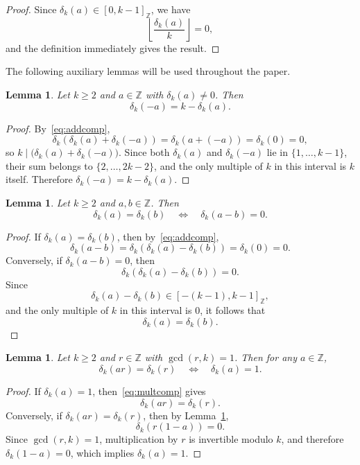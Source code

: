 \documentclass[12pt]{article}
\newtheorem{lemma}[theorem]{Lemma}
\begin{document}
\begin{proof}
Since $\delta_k(a) \in [0,k-1]_{\mathbb{Z}}$, we have
\[
\left\lfloor \frac{\delta_k(a)}{k} \right\rfloor = 0,
\]
and the definition immediately gives the result.
\end{proof}

The following auxiliary lemmas will be used throughout the paper.

\begin{lemma}\label{lema:cp2}
Let $k \ge 2$ and $a \in \mathbb{Z}$ with $\delta_k(a) \neq 0$. Then
\[
\delta_k(-a) = k - \delta_k(a).
\]
\end{lemma}

\begin{proof}
By~\eqref{eq:addcomp},
\[
\delta_k\!\left(\delta_k(a) + \delta_k(-a)\right)
= \delta_k(a + (-a))
= \delta_k(0)
= 0,
\]
so $k \mid \bigl(\delta_k(a) + \delta_k(-a)\bigr)$.
Since both $\delta_k(a)$ and $\delta_k(-a)$ lie in $\{1,\dots,k-1\}$,
their sum belongs to $\{2,\dots,2k-2\}$, and the only multiple of $k$
in this interval is $k$ itself. Therefore $\delta_k(-a) = k - \delta_k(a)$.
\end{proof}

\begin{lemma}\label{lema:despeje}
Let $k \ge 2$ and $a,b \in \mathbb{Z}$. Then
\[
\delta_k(a) = \delta_k(b)
\quad\Longleftrightarrow\quad
\delta_k(a-b) = 0.
\]
\end{lemma}

\begin{proof}
If $\delta_k(a)=\delta_k(b)$, then by~\eqref{eq:addcomp},
\[
\delta_k(a-b)
=
\delta_k\!\left(\delta_k(a)-\delta_k(b)\right)
=
\delta_k(0)
=
0.
\]
Conversely, if $\delta_k(a-b)=0$, then
\[
\delta_k\!\left(\delta_k(a)-\delta_k(b)\right)=0.
\]
Since
\[
\delta_k(a)-\delta_k(b)
\in [-(k-1),k-1]_{\mathbb{Z}},
\]
and the only multiple of $k$ in this interval is $0$, it follows that
\[
\delta_k(a)=\delta_k(b).
\]
\end{proof}

\begin{lemma}\label{lema_pote}
Let $k \ge 2$ and $r \in \mathbb{Z}$ with $\gcd(r,k)=1$. Then for any 
$a \in \mathbb{Z}$,
\[
\delta_k(ar) = \delta_k(r)
\quad\Longleftrightarrow\quad
\delta_k(a) = 1.
\]
\end{lemma}

\begin{proof}
If $\delta_k(a)=1$, then~\eqref{eq:multcomp} gives
\[
\delta_k(ar)
=
\delta_k(r).
\]
Conversely, if $\delta_k(ar)=\delta_k(r)$, then by 
Lemma~\ref{lema:despeje},
\[
\delta_k(r(1-a))=0.
\]
Since $\gcd(r,k)=1$, multiplication by $r$ is invertible modulo $k$, and 
therefore $\delta_k(1-a)=0$, which implies $\delta_k(a)=1$.
\end{proof}
\end{document}
